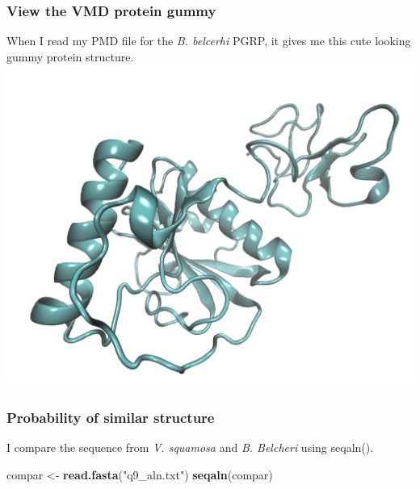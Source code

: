 \documentclass[]{article}
\newenvironment{Shaded}{\begin{snugshade}}{\end{snugshade}}
\newcommand{\KeywordTok}[1]{\textcolor[rgb]{0.13,0.29,0.53}{\textbf{#1}}}
\newcommand{\StringTok}[1]{\textcolor[rgb]{0.31,0.60,0.02}{#1}}
\newcommand{\NormalTok}[1]{#1}
\begin{document}
\subsubsection{View the VMD protein
gummy}\label{view-the-vmd-protein-gummy}

When I read my PMD file for the \emph{B. belcerhi} PGRP, it gives me
this cute looking gummy protein structure.
\includegraphics{q9_proteingummy_pgrp_bbelcheri.png}

\subsubsection{Probability of similar
structure}\label{probability-of-similar-structure}

I compare the sequence from \emph{V. squamosa} and \emph{B. Belcheri}
using seqaln().

\begin{Shaded}
\begin{Highlighting}[]
\NormalTok{compar <-}\StringTok{ }\KeywordTok{read.fasta}\NormalTok{(}\StringTok{"q9_aln.txt"}\NormalTok{)}
\KeywordTok{seqaln}\NormalTok{(compar)}
\end{Highlighting}
\end{Shaded}
\end{document}
